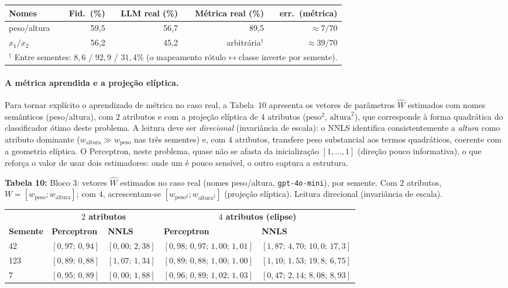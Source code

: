 \documentclass[12pt,a4paper]{article}
\newcommand{\West}{\ensuremath{\hat{W}}}   %
\begin{document}
\begin{tabular}{lrrrr}
\toprule
\textbf{Nomes} & \textbf{Fid.\ (\%)} & \textbf{LLM real (\%)} &
\textbf{Métrica real (\%)} & \textbf{err.\ (métrica)} \\
\midrule
peso/altura & 59,5 & 56,7 & 89,5 & $\approx 7/70$ \\
$x_1/x_2$   & 56,2 & 45,2 & arbitrária$^\dagger$ & $\approx 39/70$ \\
\bottomrule
\multicolumn{5}{l}{\footnotesize $^\dagger$ Entre sementes: $8{,}6$ / $92{,}9$ / $31{,}4\%$
(o mapeamento rótulo$\leftrightarrow$classe inverte por semente).}
\end{tabular}

\bigskip


\paragraph{A métrica aprendida e a projeção elíptica.}
Para tornar explícito o aprendizado de métrica no caso real, a
Tabela~10 apresenta os vetores de parâmetros \West{} estimados com nomes
semânticos (peso/altura), com $2$ atributos e com a projeção elíptica de $4$ atributos
($\text{peso}^2$, $\text{altura}^2$), que corresponde à forma quadrática do classificador
ótimo deste problema. A leitura deve ser \emph{direcional} (invariância de escala): o NNLS
identifica consistentemente a \emph{altura} como atributo dominante ($w_{\text{altura}}
\gg w_{\text{peso}}$ nas três sementes) e, com $4$ atributos, transfere peso substancial
aos termos quadráticos, coerente com a geometria elíptica. O Perceptron, neste problema,
quase não se afasta da inicialização $[1,\ldots,1]$ (direção pouco informativa), o que
reforça o valor de usar dois estimadores: onde um é pouco sensível, o outro captura a
estrutura.


\bigskip

\noindent \textbf{Tabela 10:} Bloco 3: vetores \West{} estimados no caso real (nomes peso/altura,
\texttt{gpt-4o-mini}), por semente. Com $2$ atributos, $W = [w_{\text{peso}};
w_{\text{altura}}]$; com $4$, acrescentam-se $[w_{\text{peso}^2}; w_{\text{altura}^2}]$
(projeção elíptica). Leitura direcional (invariância de escala).

\begin{tabular}{lllll}
\toprule
& \multicolumn{2}{c}{\textbf{$2$ atributos}} & \multicolumn{2}{c}{\textbf{$4$ atributos
(elipse)}} \\
\cmidrule(lr){2-3}\cmidrule(lr){4-5}
\textbf{Semente} & \textbf{Perceptron} & \textbf{NNLS} & \textbf{Perceptron} &
\textbf{NNLS} \\
\midrule
42  & $[0{,}97;\,0{,}94]$ & $[0{,}00;\,2{,}38]$ & $[0{,}98;\,0{,}97;\,1{,}00;\,1{,}01]$ &
$[1{,}87;\,4{,}70;\,10{,}0;\,17{,}3]$ \\
123 & $[0{,}89;\,0{,}88]$ & $[1{,}07;\,1{,}34]$ & $[0{,}89;\,0{,}88;\,1{,}00;\,1{,}00]$ &
$[1{,}10;\,1{,}53;\,19{,}8;\,6{,}75]$ \\
7   & $[0{,}95;\,0{,}89]$ & $[0{,}00;\,1{,}88]$ & $[0{,}96;\,0{,}89;\,1{,}02;\,1{,}03]$ &
$[0{,}47;\,2{,}14;\,8{,}08;\,8{,}93]$ \\
\bottomrule
\end{tabular}
\end{document}
